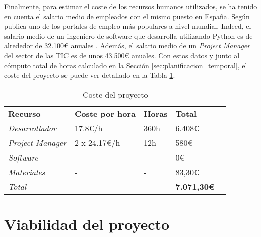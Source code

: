 \bigskip
Finalmente, para estimar el coste de los recursos
humanos utilizados, se ha tenido en cuenta el salario medio de empleados con el mismo puesto en España. Según publica
uno de los portales de empleo más populares a nivel mundial, Indeed, el salario medio de un ingeniero de software que desarrolla
utilizando Python es de alrededor de 32.100€ anuales \cite{indeedsalario}. Además, el salario medio de un \textit{Project Manager}
del sector de las TIC es de unos 43.500€ anuales. Con estos datos y junto al cómputo total de horas calculado en la Sección \ref{sec:planificacion_temporal},
el coste del proyecto se puede ver detallado en la Tabla \ref{tab:costes}.

\bigskip
\begin{table}[H]
	\centering
	\begin{tabular}{l|l|l|l|l}
		\rowcolor{udcpink!25}
		\small \textbf{Recurso} & \small \textbf{Coste por hora} & \small \textbf{Horas} & \small \textbf{Total} \\
		\small \textit{Desarrollador} & \small 17.8€/h & \small 360h & \small 6.408€ \\
		\small \textit{Project Manager} & \small 2 x 24.17€/h & \small 12h & \small 580€ \\
		\small \textit{Software} & \small - & \small - & \small 0€ \\
		\small \textit{Materiales} & \small - & \small - & \small 83,30€ \\
		\small \textit{Total} & \small - & \small - & \small \textbf{7.071,30€} \\
	\end{tabular}
	\caption{Coste del proyecto}
	\label{tab:costes}
\end{table}

\section{Viabilidad del proyecto}
